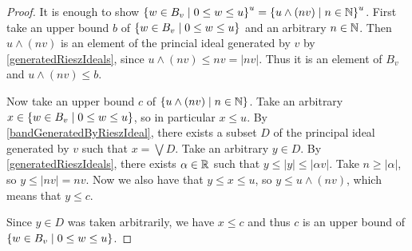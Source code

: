\begin{proof}
It is enough to show $\setbuilder{w\in B_v}{0\leq w\leq u}^u = \setbuilder{u\wedge (nv)}{n\in \N}^u$. First take an upper bound $b$ of $\setbuilder{w\in B_v}{0\leq w\leq u}$ and an arbitrary $n\in \mathbb{N}$. Then $u\wedge (nv)$ is an element of the princial ideal generated by $v$ by \ref{generatedRieszIdeals}, since $u\wedge (nv) \leq nv = |nv|$. Thus it is an element of $B_v$ and $u\wedge (nv)\leq b$.

Now take an upper bound $c$ of $\setbuilder{u\wedge (nv)}{n\in \N}$. Take an arbitrary $x\in \setbuilder{w\in B_v}{0\leq w\leq u}$, so in particular $x\leq u$. By \ref{bandGeneratedByRieszIdeal}, there exists a subset $D$ of the principal ideal generated by $v$ such that $x = \bigvee D$. Take an arbitrary $y\in D$. By \ref{generatedRieszIdeals}, there exists $\alpha \in \mathbb{R}$ such that $y\leq |y|\leq |\alpha v|$. Take $n\geq |\alpha|$, so $y \leq |nv| = nv$. Now we also have that $y\leq x \leq u$, so $y \leq u\wedge (nv)$, which means that $y \leq c$.

Since $y\in D$ was taken arbitrarily, we have $x\leq c$ and thus $c$ is an upper bound of $\setbuilder{w\in B_v}{0\leq w\leq u}$.
\end{proof}


